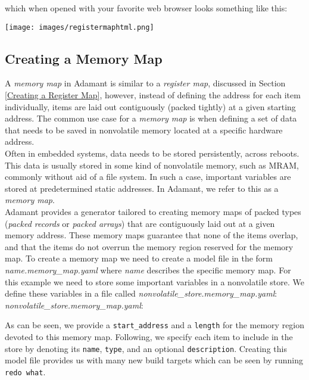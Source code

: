 which when opened with your favorite web browser looks something like this:

\vspace{5mm} %
\texttt{[image: images/registermaphtml.png]}
\vspace{5mm} %

\subsection{Creating a Memory Map} \label{Creating a Memory Map}

A \textit{memory map} in Adamant is similar to a \textit{register map}, discussed in Section \ref{Creating a Register Map}, however, instead of defining the address for each item individually, items are laid out contiguously (packed tightly) at a given starting address. The common use case for a \textit{memory map} is when defining a set of data that needs to be saved in nonvolatile memory located at a specific hardware address. \\

Often in embedded systems, data needs to be stored persistently, across reboots. This data is usually stored in some kind of nonvolatile memory, such as MRAM, commonly without aid of a file system. In such a case, important variables are stored at predetermined static addresses. In Adamant, we refer to this as a \textit{memory map}. \\

Adamant provides a generator tailored to creating memory maps of packed types (\textit{packed records} or \textit{packed arrays}) that are contiguously laid out at a given memory address. These memory maps guarantee that none of the items overlap, and that the items do not overrun the memory region reserved for the memory map. To create a memory map we need to create a model file in the form \textit{name.memory\_map.yaml} where \textit{name} describes the specific memory map. For this example we need to store some important variables in a nonvolatile store. We define these variables in a file called \textit{nonvolatile\_store.memory\_map.yaml}: \\

\textit{nonvolatile\_store.memory\_map.yaml}:

As can be seen, we provide a \texttt{start\_address} and a \texttt{length} for the memory region devoted to this memory map. Following, we specify each item to include in the store by denoting its \texttt{name}, \texttt{type}, and an optional \texttt{description}. Creating this model file provides us with many new build targets which can be seen by running \texttt{redo what}.

